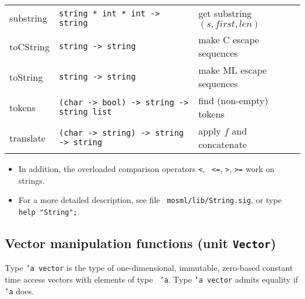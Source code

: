 \documentclass[fleqn]{article}
\begin{document}
\begin{tabular}{@{\tt\ \ }lll}
substring & {\tt string * int * int -> string} & get substring
$(s, first, len)$\\

toCString  & {\tt string -> string} & make C escape sequences\\

toString  & {\tt string -> string} & make ML escape sequences\\

tokens    & {\tt (char -> bool) -> string -> string list} & find
(non-empty) tokens\\

translate & {\tt (char -> string) -> string -> string} & apply $f$ 
and concatenate\\\hline
\end{tabular}

\begin{itemize}

\item In addition, the overloaded comparison operators {\tt <}, {\tt
    <=}, {\tt >}, {\tt >=} work on strings.

\item For a more detailed description, see file {\tt
    mosml/lib/String.sig}, or type {\tt help "String";}.  
\end{itemize}


\subsection*{Vector manipulation functions (unit {\tt Vector})}

Type {\tt 'a vector} is the type of one-dimensional, immutable,
zero-based constant time access vectors with elements of type {\tt
  'a}.  Type {\tt 'a vector} admits equality if {\tt 'a} does.

\vspace{1ex}
\end{document}
